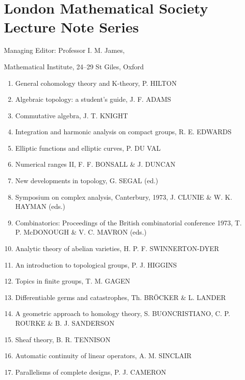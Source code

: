 \chapter*{London Mathematical Society\\Lecture Note Series}
Managing Editor: Professor I. M. James,\par
Mathematical Institute, 24--29 St Giles, Oxford
\begingroup\small
\begin{enumerate}[leftmargin=2.5em,itemsep=2pt,parsep=0pt]
\item[1.] General cohomology theory and K-theory, P. HILTON
\item[4.] Algebraic topology: a student's guide, J. F. ADAMS
\item[5.] Commutative algebra, J. T. KNIGHT
\item[8.] Integration and harmonic analysis on compact groups, R. E. EDWARDS
\item[9.] Elliptic functions and elliptic curves, P. DU VAL
\item[10.] Numerical ranges II, F. F. BONSALL \& J. DUNCAN
\item[11.] New developments in topology, G. SEGAL (ed.)
\item[12.] Symposium on complex analysis, Canterbury, 1973, J. CLUNIE \& W. K. HAYMAN (eds.)
\item[13.] Combinatorics: Proceedings of the British combinatorial conference 1973, T. P. McDONOUGH \& V. C. MAVRON (eds.)
\item[14.] Analytic theory of abelian varieties, H. P. F. SWINNERTON-DYER
\item[15.] An introduction to topological groups, P. J. HIGGINS
\item[16.] Topics in finite groups, T. M. GAGEN
\item[17.] Differentiable germs and catastrophes, Th. BR\"OCKER \& L. LANDER
\item[18.] A geometric approach to homology theory, S. BUONCRISTIANO, C. P. ROURKE \& B. J. SANDERSON
\item[20.] Sheaf theory, B. R. TENNISON
\item[21.] Automatic continuity of linear operators, A. M. SINCLAIR
\item[23.] Parallelisms of complete designs, P. J. CAMERON

\end{enumerate}
